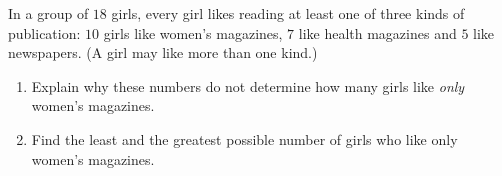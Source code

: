 In a group of $18$ girls, every girl likes reading at least one of three kinds of publication: $10$ girls like women's magazines, $7$ like health magazines and $5$ like newspapers. (A girl may like more than one kind.)
\begin{enumerate}
\item[(a)] Explain why these numbers do not determine how many girls like \emph{only} women's magazines.
\item[(b)] Find the least and the greatest possible number of girls who like only women's magazines.
\end{enumerate}

